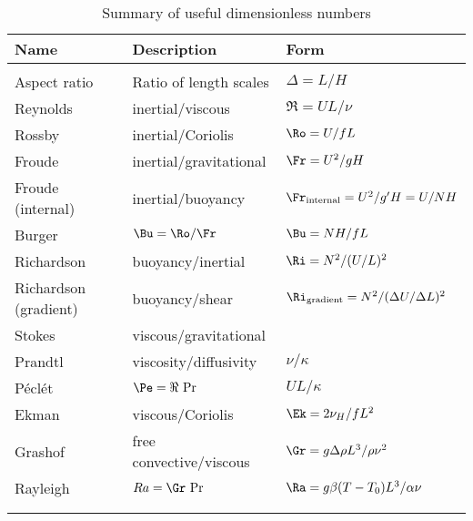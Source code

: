 \begin{table}[t]
\begin{center}
\begin{tabular}{lll} \hline
Name        &   Description         &   Form        \\  \hline
            &                           &               \\
Aspect ratio   &   Ratio of length scales   &   $\Delta=L/H$  \\
Reynolds    &   inertial/viscous        &   $\Re=UL/\nu$    \\
Rossby      &   inertial/Coriolis\footnotemark[6]            &   $\Ro=U/fL$      \\
Froude      &   inertial/gravitational\footnotemark[7] &   $\Fr=U^2/gH$    \\
Froude (internal)   &   inertial/buoyancy   &   $\Fr_{\mathrm{internal}}=U^2/g'H=U/NH$   \\
Burger      &  $\Bu=\Ro/\Fr$    &   $\Bu = NH/fL$  \\
Richardson  &   buoyancy/inertial\footnotemark[8]       &   $\Ri=N^2/(U/L)^2$   \\
Richardson (gradient)   &   buoyancy/shear  &   $\Ri_{\mathrm{gradient}}=N^2/(\Delta U/\Delta L)^2$ \\
Stokes      &   viscous/gravitational   &   \\
Prandtl     &   viscosity/diffusivity   &  $\nu/\kappa$ \\
P\'ecl\'et  &     $\Pe=\Re\,\Pr$  &  $UL/\kappa$ \\
Ekman       &   viscous/Coriolis    &   $\Ek=2\nu_H/fL^2$   \\
Grashof     &    free convective/viscous    & $\Gr=g\Delta\rho L^3/\rho \nu^2$\\
Rayleigh    &     $Ra=\Gr\,\Pr$                 & $\Ra = g\beta(T-T_0)L^3/\alpha\nu$\\
            &                           &               \\  \hline
\label{table:dimensionless}
\end{tabular}
\end{center}

\caption{Summary of useful dimensionless numbers}
\label{tab:dimensionless}
\end{table}

